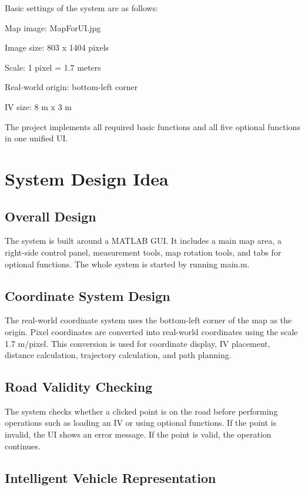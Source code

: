\documentclass[12pt,a4paper]{ctexart}
\begin{document}
Basic settings of the system are as follows:

Map image: MapForUI.jpg

Image size: 803 x 1404 pixels

Scale: 1 pixel = 1.7 meters

Real-world origin: bottom-left corner

IV size: 8 m x 3 m

The project implements all required basic functions and all five optional functions in one unified UI.

\section{System Design Idea}

\subsection{Overall Design}

The system is built around a MATLAB GUI. It includes a main map area, a right-side control panel, measurement tools, map rotation tools, and tabs for optional functions. The whole system is started by running main.m.

\subsection{Coordinate System Design}

The real-world coordinate system uses the bottom-left corner of the map as the origin. Pixel coordinates are converted into real-world coordinates using the scale 1.7 m/pixel. This conversion is used for coordinate display, IV placement, distance calculation, trajectory calculation, and path planning.

\subsection{Road Validity Checking}

The system checks whether a clicked point is on the road before performing operations such as loading an IV or using optional functions. If the point is invalid, the UI shows an error message. If the point is valid, the operation continues.

\subsection{Intelligent Vehicle Representation}
\end{document}
